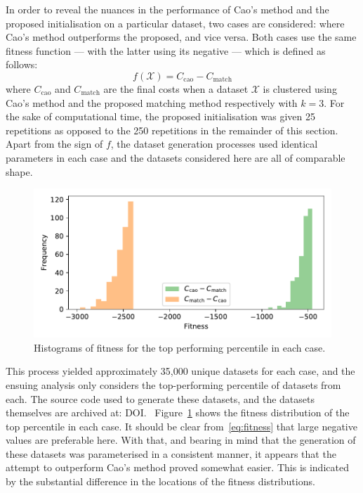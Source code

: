 In order to reveal the nuances in the performance of Cao's method and the
proposed initialisation on a particular dataset, two cases are considered:
where Cao's method outperforms the proposed, and vice versa. Both cases use the
same fitness function --- with the latter using its negative --- which is
defined as follows:
\begin{equation}\label{eq:fitness}
    f\left(\mathcal X\right) = C_{\mathrm{cao}} - C_{\mathrm{match}}
\end{equation}
where \(C_{\mathrm{cao}}\) and \(C_{\mathrm{match}}\) are the final costs when a
dataset \(\mathcal X\) is clustered using Cao's method and the proposed matching
method respectively with \(k = 3\). For the sake of computational time, the
proposed initialisation was given 25 repetitions as opposed to the 250
repetitions in the remainder of this section. Apart from the sign of \(f\), the
dataset generation processes used identical parameters in each case and the
datasets considered here are all of comparable shape.

\begin{figure}
    \centering
    \includegraphics[width=\imgwidth]{fitness.pdf}
    \caption{Histograms of fitness for the top performing percentile in each
             case.}\label{fig:fitness}
\end{figure}

This process yielded approximately 35,000 unique datasets for each case, and the
ensuing analysis only considers the top-performing percentile of datasets from
each. The source code used to generate these datasets, and the datasets
themselves are archived at: DOI.\ %
Figure~\ref{fig:fitness} shows the fitness distribution of the top
percentile in each case. It should be clear from~\eqref{eq:fitness} that large
negative values are preferable here. With that, and bearing in mind that the
generation of these datasets was parameterised in a consistent manner, it
appears that the attempt to outperform Cao's method proved somewhat easier. This
is indicated by the substantial difference in the locations of the fitness
distributions.

